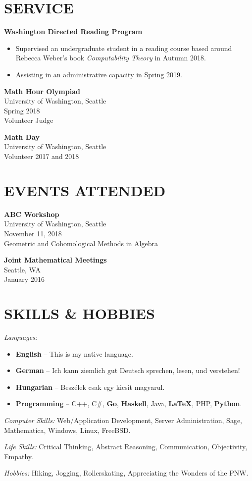 \documentclass[margin, 10pt]{res} %
\begin{document}
\begin{resume}
\section{SERVICE}

{\bf Washington Directed Reading Program}
\begin{itemize}
	\item Supervised an undergraduate student in a reading course based around Rebecca Weber's book {\sl Computability Theory} in Autumn 2018.
	\item Assisting in an administrative capacity in Spring 2019.
\end{itemize}

{\bf Math Hour Olympiad}\\
University of Washington, Seattle\\
Spring 2018\\
Volunteer Judge

{\bf Math Day}\\
University of Washington, Seattle\\
Volunteer 2017 and 2018

{\bf }

\section{\bf EVENTS ATTENDED}

{\bf ABC Workshop}\\
University of Washington, Seattle\\
November 11, 2018\\
Geometric and Cohomological Methods in Algebra

{\bf Joint Mathematical Meetings}\\
Seattle, WA\\
January 2016


\section{SKILLS \& HOBBIES} 

{\sl Languages:}
\begin{itemize} \itemsep -2pt
	\item {\bfseries English} -- This is my native language.
	\item {\bfseries German} -- Ich kann ziemlich gut Deutsch sprechen, lesen, und verstehen!
	\item {\bfseries Hungarian} -- Besz\'elek csak egy kicsit magyarul.
	\item {\bfseries Programming} -- C++, C\#, {\bf Go}, {\bf Haskell}, Java, {\bf \LaTeX}, PHP, {\bf Python}.
\end{itemize}
{\sl Computer Skills:} Web/Application Development, Server Administration, Sage, Mathematica, Windows, Linux, FreeBSD.

{\sl Life Skills:} Critical Thinking, Abstract Reasoning, Communication, Objectivity, Empathy.

{\sl Hobbies:} Hiking, Jogging, Rollerskating, Appreciating the Wonders of the PNW.



\end{resume}
\end{document}
